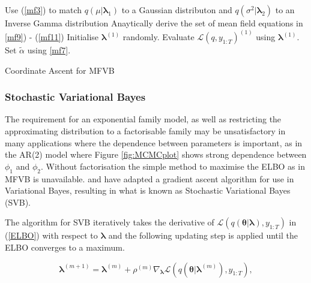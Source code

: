 \documentclass[12pt,a4paper]{article}%
\numberwithin{equation}{section}
\begin{document}
\vspace{5mm}
\begin{algorithm}[H]
 Use (\ref{mf3}) to match $q(\mu|\boldsymbol{\lambda}_1)$ to a Gaussian distributon and $q(\sigma^2 | \boldsymbol{\lambda}_2)$ to an Inverse Gamma distribution\;
 Anaytically derive the set of mean field equations in \ref{mf9}) - (\ref{mf11})\;
 Initialise $\boldsymbol{\lambda}^{(1)}$ randomly.\;
 Evaluate $\mathcal{L}(q, y_{1:T})^{(1)}$ using $\boldsymbol{\lambda}^{(1)}$.\;
 Set $\tilde{\alpha}$ using \ref{mf7}.\;
 \caption{Coordinate Ascent for MFVB}
  \label{alg:algorithm1}
\end{algorithm}

\subsubsection{Stochastic Variational Bayes}

The requirement for an exponential family model, as well as restricting the approximating distribution to a factorisable family may be unsatisfactory in many applications where the dependence between parameters is important, as in the AR(2) model where Figure \ref{fig:MCMCplot} shows strong dependence between $\phi_1$ and $\phi_2$. Without factorisation the simple method to maximise the ELBO as in MFVB is unavailable. \citet{Paisley2012} and \citet{Ranganath2014} have adapted a gradient ascent algorithm for use in Variational Bayes, resulting in what is known as Stochastic Variational Bayes (SVB).

The algorithm for SVB iteratively takes the  derivative of $\mathcal{L}(q(\boldsymbol{\theta} | \boldsymbol{\lambda}), y_{1:T})$ in (\ref{ELBO}) with respect to $\boldsymbol{\lambda}$ and the following updating step is applied until the ELBO converges to a maximum.

\begin{equation}
\label{SGA1}
\boldsymbol{\lambda}^{(m+1)} = \boldsymbol{\lambda}^{(m)} + \rho^{(m)} \nabla_{\boldsymbol{\lambda}} \mathcal{L}(q(\boldsymbol{\theta} | \boldsymbol{\lambda}^{(m)}), y_{1:T}),
\end{equation}
\end{document}
